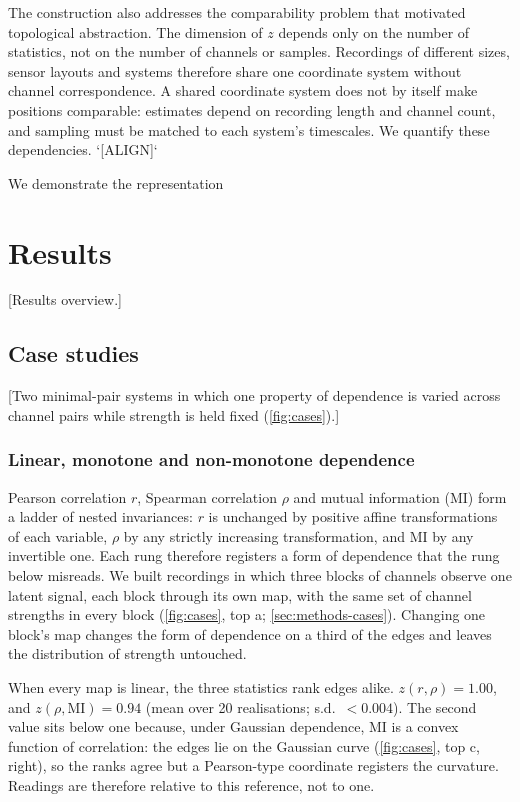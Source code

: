\documentclass[pdflatex,sn-nature,iicol]{sn-jnl}
\newcommand{\will}[1]{\textcolor{mypurple}{[#1]}}
\newcommand{\will}[1]{}
\begin{document}
The construction also addresses the comparability problem that motivated topological abstraction. The dimension of $z$ depends only on the number of statistics, not on the number of channels or samples. Recordings of different sizes, sensor layouts and systems therefore share one coordinate system without channel correspondence. A shared coordinate system does not by itself make positions comparable: estimates depend on recording length and channel count, and sampling must be matched to each system's timescales. We quantify these dependencies. `[ALIGN]`

We demonstrate the representation

\ifnature\else
  
\fi

\section{Results}
\label{sec:results}
\will{Results overview.}

\subsection{Case studies}
\label{sec:cases}
\will{Two minimal-pair systems in which one property of dependence is varied across channel pairs while strength is held fixed (\cref{fig:cases}).}

\subsubsection{Linear, monotone and non-monotone dependence}
\label{sec:cases-form}
Pearson correlation $r$, Spearman correlation $\rho$ and mutual information (MI) form a ladder of nested invariances: $r$ is unchanged by positive affine transformations of each variable, $\rho$ by any strictly increasing transformation, and MI by any invertible one. Each rung therefore registers a form of dependence that the rung below misreads. We built recordings in which three blocks of channels observe one latent signal, each block through its own map, with the same set of channel strengths in every block (\cref{fig:cases}, top a; \cref{sec:methods-cases}). Changing one block's map changes the form of dependence on a third of the edges and leaves the distribution of strength untouched.

When every map is linear, the three statistics rank edges alike. $z(r,\rho) = 1.00$, and $z(\rho,\mathrm{MI}) = 0.94$ (mean over 20 realisations; s.d.\ $< 0.004$). The second value sits below one because, under Gaussian dependence, MI is a convex function of correlation: the edges lie on the Gaussian curve (\cref{fig:cases}, top c, right), so the ranks agree but a Pearson-type coordinate registers the curvature. Readings are therefore relative to this reference, not to one.
\end{document}
